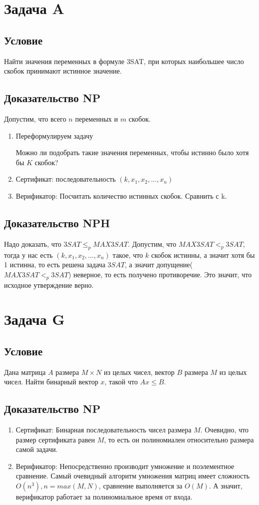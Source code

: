 \documentclass{article}
\begin{document}
\section*{Задача A} 

\subsection*{Условие} 
Найти значения переменных в формуле 3SAT, при которых наибольшее число
скобок принимают истинное значение.
\subsection*{Доказательство NP}
Допустим, что всего $n$ переменных и $m$ скобок.
\begin{enumerate}
\item Переформулируем задачу

Можно ли подобрать такие значения переменных, чтобы истинно было хотя бы $K$ скобок?

\item Сертификат: последовательность $(k, x_1, x_2, ..., x_n)$
\item Верификатор: Посчитать количество истинных скобок. Сравнить с k.

\end{enumerate}
\subsection*{Доказательство NPH}
Надо доказать, что $3SAT \leq_p MAX3SAT$. Допустим, что $MAX3SAT <_p 3SAT$, тогда у нас есть  $(k, x_1, x_2, ..., x_n)$ такое, что $k$ скобок истинны, а значит хотя бы 1 истинна, то есть решена задача $3SAT$, а значит  допущение($MAX3SAT <_p 3SAT$) неверное, то есть получено противоречие. Это значит, что исходное утверждение верно.
\newpage

\section*{Задача G} 

\subsection*{Условие} 
Дана матрица $A$ размера $M \times N$ из целых чисел, вектор $B$ размера $M$ из целых чисел. Найти бинарный вектор $x$, такой что $Ax \leq B$.

\subsection*{Доказательство NP}
\begin{enumerate}
\item Сертификат: Бинарная последовательность чисел размера $M$. Очевидно, что размер сертификата равен $M$, то есть он полиномиален относительно размера самой задачи.
\item Верификатор: Непосредственно производит умножение и поэлементное сравнение. Самый очевидный алгоритм умножения матриц имеет сложность $O(n^3), n = max(M, N)$, сравнение выполняется за $O(M)$. А значит, верификатор работает за полиномиальное время от входа.
\end{enumerate}
\end{document}

